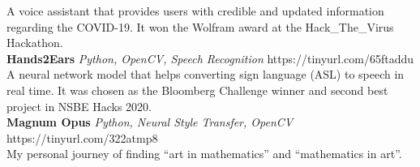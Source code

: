 \documentclass[a4paper]{article}
\begin{document}
A voice assistant that provides users with credible and updated information regarding the COVID-19. It won the Wolfram award at the Hack\_The\_Virus Hackathon.\\
\vspace*{2mm}
{\textbf{Hands2Ears}} {\sl Python, OpenCV, Speech Recognition} \hfill https://tinyurl.com/65ftaddu\\
A neural network model that helps converting sign language (ASL) to speech in real time. It was chosen as the Bloomberg Challenge winner and second best project in NSBE Hacks 2020.\\
\vspace*{2mm}
{\textbf{Magnum Opus}} {\sl Python, Neural Style Transfer, OpenCV} \hfill https://tinyurl.com/322atmp8\\
My personal journey of finding “art in mathematics” and “mathematics in art”.\\
\vspace*{2mm}
\end{document}
